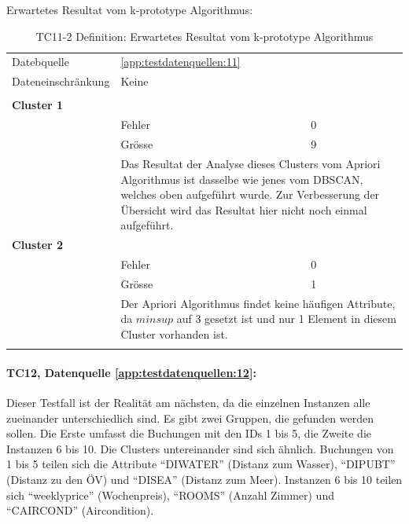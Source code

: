 Erwartetes Resultat vom k-prototype Algorithmus:
\begin{longtable}{ | l | l | l | l |} 	
	\hline 
	\rowcolor{tableheadcolor}
	\multicolumn{4}{|l|}{\bfseries ID: TC11-2 k-prototype} \\ \hline 
	Datebquelle & \multicolumn{3}{|l|}{\cref{app:testdatenquellen:11}} \\ \hline 
	Dateneinschränkung & \multicolumn{3}{|l|}{Keine} \\ \hline 
	
	\rowcolor{tableheadcolor}
	\multicolumn{4}{|l|}{\bfseries Erwartetes Resultat} \\ \hline 

	\multicolumn{4}{|l|}{\textbf{Cluster 1}} \\ \cline{2-4} 
	& Fehler & \multicolumn{2}{|l|}{0} \\ \cline{2-4} 
	& Grösse & \multicolumn{2}{|l|}{9} \\ \cline{2-4} 
	& \multicolumn{3}{|L{7.5cm}|}{Das Resultat der Analyse dieses Clusters vom Apriori Algorithmus ist dasselbe wie jenes vom DBSCAN, welches oben aufgeführt wurde. Zur Verbesserung der Übersicht wird das Resultat hier nicht noch einmal aufgeführt.} \\ \hline

	\multicolumn{4}{|l|}{\textbf{Cluster 2}} \\ \cline{2-4} 
	& Fehler & \multicolumn{2}{|l|}{0} \\ \cline{2-4} 
	& Grösse & \multicolumn{2}{|l|}{1} \\ \cline{2-4} 
	& \multicolumn{3}{|L{7.5cm}|}{Der Apriori Algorithmus findet keine häufigen Attribute, da $minsup$ auf 3 gesetzt ist und nur 1 Element in diesem Cluster vorhanden ist.} \\ \hline
	\caption{TC11-2 Definition: Erwartetes Resultat vom k-prototype Algorithmus}
	\centering
	\label{fig:recherche:testcases:11:2}
\end{longtable}

\paragraph{TC12, Datenquelle \cref{app:testdatenquellen:12}:} Dieser Testfall ist der Realität am nächsten, da die einzelnen Instanzen alle zueinander unterschiedlich sind. Es gibt zwei Gruppen, die gefunden werden sollen. Die Erste umfasst die Buchungen mit den IDs 1 bis 5, die Zweite die Instanzen 6 bis 10. Die Clusters untereinander sind sich ähnlich. Buchungen von 1 bis 5 teilen sich die Attribute "`DIWATER"' (Distanz zum Wasser), "`DIPUBT"' (Distanz zu den ÖV) und "`DISEA"' (Distanz zum Meer). Instanzen 6 bis 10 teilen sich "`weeklyprice"' (Wochenpreis), "`ROOMS"' (Anzahl Zimmer) und "`CAIRCOND"' (Aircondition). 

